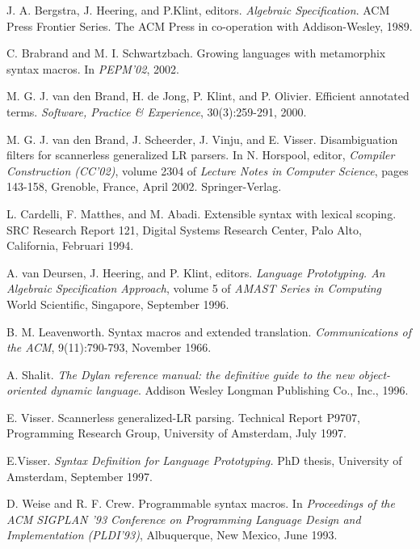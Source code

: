 \documentclass[a4paper,11pt]{article}
\begin{document}
\begin{thebibliography}{99}

J. A. Bergstra, J. Heering, and P.Klint, editors. \emph{Algebraic
Specification}. ACM Press Frontier Series. The ACM Press in co-operation with Addison-Wesley,
1989.

C. Brabrand and M. I. Schwartzbach. Growing languages with metamorphix
syntax macros. In \emph{PEPM'02}, 2002.

M. G. J. van den Brand, H. de Jong, P. Klint, and P. Olivier. Efficient
annotated terms. \emph{Software, Practice \& Experience}, 30(3):259-291, 2000.

M. G. J. van den Brand, J. Scheerder, J. Vinju, and E. Visser.
Disambiguation filters for scannerless generalized LR parsers. In N. Horspool, editor,
\emph{Compiler Construction (CC'02)}, volume 2304 of \emph{Lecture Notes in Computer
Science}, pages 143-158, Grenoble, France, April 2002. Springer-Verlag.

L. Cardelli, F. Matthes, and M. Abadi. Extensible syntax with lexical
scoping. SRC Research Report 121, Digital Systems Research Center, Palo Alto,
California, Februari 1994.

A. van Deursen, J. Heering, and P. Klint, editors. \emph{Language Prototyping.
An Algebraic Specification Approach}, volume 5 of \emph{AMAST Series in Computing} World
Scientific, Singapore, September 1996.

B. M. Leavenworth. Syntax macros and extended translation. \emph{Communications
of the ACM}, 9(11):790-793, November 1966.

A. Shalit. \emph{The Dylan reference manual: the definitive guide
to the new object-oriented dynamic language}. Addison Wesley Longman Publishing
Co., Inc., 1996.

E. Visser. Scannerless generalized-LR parsing.
Technical Report P9707, Programming Research Group, University of Amsterdam, July 1997.

E.Visser. \emph{Syntax Definition for Language Prototyping.} PhD
thesis, University of Amsterdam, September 1997.

D. Weise and R. F. Crew. Programmable syntax macros. In \emph{Proceedings
of the ACM SIGPLAN '93 Conference on Programming Language Design and Implementation
(PLDI'93)}, Albuquerque, New Mexico, June 1993.

\end{thebibliography}
\end{document}
